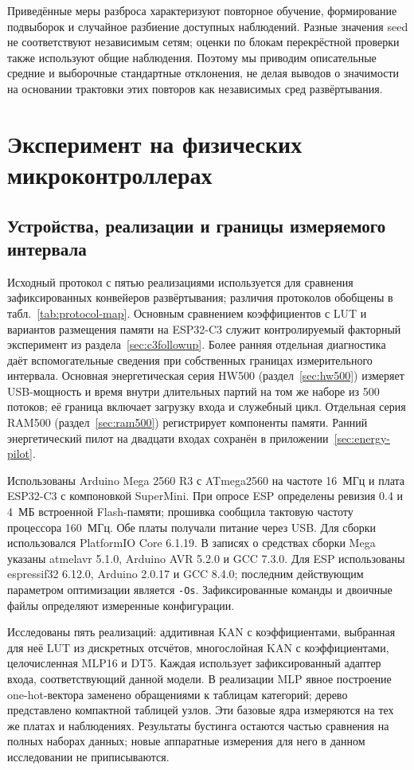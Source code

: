 Приведённые меры разброса характеризуют повторное обучение, формирование подвыборок и случайное разбиение доступных наблюдений. Разные значения seed не соответствуют независимым сетям; оценки по блокам перекрёстной проверки также используют общие наблюдения. Поэтому мы приводим описательные средние и выборочные стандартные отклонения, не делая выводов о значимости на основании трактовки этих повторов как независимых сред развёртывания.



\section{Эксперимент на физических микроконтроллерах}
\subsection{Устройства, реализации и границы измеряемого интервала}
Исходный протокол с пятью реализациями используется для сравнения зафиксированных конвейеров развёртывания; различия протоколов обобщены в табл.~\ref{tab:protocol-map}. Основным сравнением коэффициентов с LUT и вариантов размещения памяти на ESP32-C3 служит контролируемый факторный эксперимент из раздела~\ref{sec:c3followup}. Более ранняя отдельная диагностика даёт вспомогательные сведения при собственных границах измерительного интервала. Основная энергетическая серия HW500 (раздел~\ref{sec:hw500}) измеряет USB-мощность и время внутри длительных партий на том же наборе из 500 потоков; её граница включает загрузку входа и служебный цикл. Отдельная серия RAM500 (раздел~\ref{sec:ram500}) регистрирует компоненты памяти. Ранний энергетический пилот на двадцати входах сохранён в приложении~\ref{sec:energy-pilot}.

Использованы Arduino Mega 2560 R3 с ATmega2560 на частоте 16~МГц и плата ESP32-C3 с компоновкой SuperMini. При опросе ESP определены ревизия 0.4 и 4~МБ встроенной Flash-памяти; прошивка сообщила тактовую частоту процессора 160~МГц. Обе платы получали питание через USB. Для сборки использовался PlatformIO Core 6.1.19. В записях о средствах сборки Mega указаны atmelavr 5.1.0, Arduino AVR 5.2.0 и GCC 7.3.0. Для ESP использованы espressif32 6.12.0, Arduino 2.0.17 и GCC 8.4.0; последним действующим параметром оптимизации является \texttt{-Os}. Зафиксированные команды и двоичные файлы определяют измеренные конфигурации.

Исследованы пять реализаций: аддитивная KAN с коэффициентами, выбранная для неё LUT из дискретных отсчётов, многослойная KAN с коэффициентами, целочисленная MLP16 и DT5. Каждая использует зафиксированный адаптер входа, соответствующий данной модели. В реализации MLP явное построение one-hot-вектора заменено обращениями к таблицам категорий; дерево представлено компактной таблицей узлов. Эти базовые ядра измеряются на тех же платах и наблюдениях. Результаты бустинга остаются частью сравнения на полных наборах данных; новые аппаратные измерения для него в данном исследовании не приписываются.

